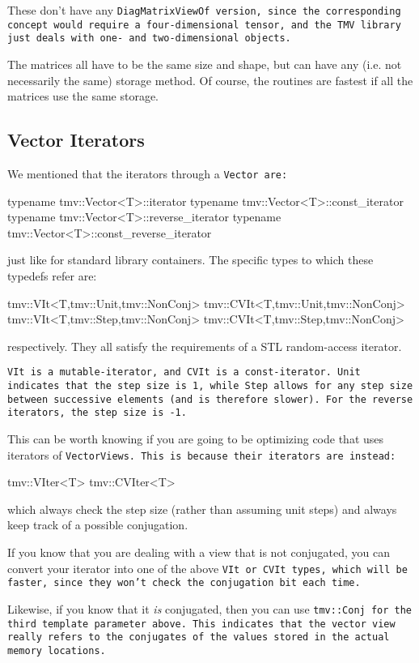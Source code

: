 These don't have any \tt{DiagMatrixViewOf} version, since the corresponding 
concept would require a four-dimensional tensor, and the TMV library
just deals with one- and two-dimensional objects.

The matrices all have to be the same size and shape, but can have any 
(i.e. not necessarily the same) storage method.  Of course, the routines are fastest
if all the matrices use the same storage.

\subsection{Vector Iterators}
\label{VectorIterators}

We mentioned that the iterators through a \tt{Vector} are:
\begin{tmvcode}
typename tmv::Vector<T>::iterator
typename tmv::Vector<T>::const_iterator
typename tmv::Vector<T>::reverse_iterator
typename tmv::Vector<T>::const_reverse_iterator
\end{tmvcode}
just like for standard library containers.  The specific types to which these
typedefs refer are:
\begin{tmvcode}
tmv::VIt<T,tmv::Unit,tmv::NonConj>
tmv::CVIt<T,tmv::Unit,tmv::NonConj>
tmv::VIt<T,tmv::Step,tmv::NonConj>
tmv::CVIt<T,tmv::Step,tmv::NonConj>
\end{tmvcode}
respectively.  They all satisfy the requirements of a STL random-access iterator.

\tt{VIt} is a mutable-iterator, and \tt{CVIt} is a const-iterator.  \tt{Unit} 
indicates that the step size is 1, while \tt{Step} allows for any step size
between successive elements (and is therefore slower).  For the reverse
iterators, the step size is -1.

This can be worth knowing if you are going to be optimizing code that uses
iterators of \tt{VectorView}s.
This is because their iterators are instead:
\begin{tmvcode}
tmv::VIter<T>
tmv::CVIter<T>
\end{tmvcode}
which always check the step size (rather than assuming unit steps) and always
keep track of a possible conjugation.

If you know that you are dealing with a view that is not conjugated, you can 
convert your iterator into one of the above \tt{VIt} or \tt{CVIt} types, which will be 
faster, since they won't check the conjugation bit each time. 

Likewise, if you
know that it {\em is} conjugated, then you can use \tt{tmv::Conj} for the 
third template parameter above.  This indicates that the vector view really
refers to the conjugates of the values stored in the actual memory locations.

